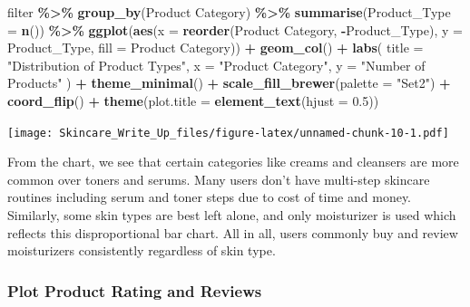 \documentclass[
]{article}
\newenvironment{Shaded}{\begin{snugshade}}{\end{snugshade}}
\newcommand{\AttributeTok}[1]{\textcolor[rgb]{0.13,0.29,0.53}{#1}}
\newcommand{\FloatTok}[1]{\textcolor[rgb]{0.00,0.00,0.81}{#1}}
\newcommand{\FunctionTok}[1]{\textcolor[rgb]{0.13,0.29,0.53}{\textbf{#1}}}
\newcommand{\NormalTok}[1]{#1}
\newcommand{\SpecialCharTok}[1]{\textcolor[rgb]{0.81,0.36,0.00}{\textbf{#1}}}
\newcommand{\StringTok}[1]{\textcolor[rgb]{0.31,0.60,0.02}{#1}}
\begin{document}
\begin{Shaded}
\begin{Highlighting}[]
\NormalTok{filter }\SpecialCharTok{\%\textgreater{}\%}
  \FunctionTok{group\_by}\NormalTok{(}\StringTok{\textasciigrave{}}\AttributeTok{Product Category}\StringTok{\textasciigrave{}}\NormalTok{) }\SpecialCharTok{\%\textgreater{}\%}
  \FunctionTok{summarise}\NormalTok{(}\AttributeTok{Product\_Type =} \FunctionTok{n}\NormalTok{()) }\SpecialCharTok{\%\textgreater{}\%}
  \FunctionTok{ggplot}\NormalTok{(}\FunctionTok{aes}\NormalTok{(}\AttributeTok{x =} \FunctionTok{reorder}\NormalTok{(}\StringTok{\textasciigrave{}}\AttributeTok{Product Category}\StringTok{\textasciigrave{}}\NormalTok{, }\SpecialCharTok{{-}}\NormalTok{Product\_Type), }\AttributeTok{y =}\NormalTok{ Product\_Type, }\AttributeTok{fill =} \StringTok{\textasciigrave{}}\AttributeTok{Product Category}\StringTok{\textasciigrave{}}\NormalTok{)) }\SpecialCharTok{+}
  \FunctionTok{geom\_col}\NormalTok{() }\SpecialCharTok{+}
  \FunctionTok{labs}\NormalTok{(}
    \AttributeTok{title =} \StringTok{"Distribution of Product Types"}\NormalTok{,}
    \AttributeTok{x =} \StringTok{"Product Category"}\NormalTok{,}
    \AttributeTok{y =} \StringTok{"Number of Products"}
\NormalTok{  ) }\SpecialCharTok{+}
  \FunctionTok{theme\_minimal}\NormalTok{() }\SpecialCharTok{+}
  \FunctionTok{scale\_fill\_brewer}\NormalTok{(}\AttributeTok{palette =} \StringTok{"Set2"}\NormalTok{) }\SpecialCharTok{+} 
  \FunctionTok{coord\_flip}\NormalTok{() }\SpecialCharTok{+}  
  \FunctionTok{theme}\NormalTok{(}\AttributeTok{plot.title =} \FunctionTok{element\_text}\NormalTok{(}\AttributeTok{hjust =} \FloatTok{0.5}\NormalTok{))}
\end{Highlighting}
\end{Shaded}

\texttt{[image: Skincare\_Write\_Up\_files/figure-latex/unnamed-chunk-10-1.pdf]}

From the chart, we see that certain categories like creams and cleansers
are more common over toners and serums. Many users don't have multi-step
skincare routines including serum and toner steps due to cost of time
and money. Similarly, some skin types are best left alone, and only
moisturizer is used which reflects this disproportional bar chart. All
in all, users commonly buy and review moisturizers consistently
regardless of skin type.

\subsubsection{Plot Product Rating and
Reviews}\label{plot-product-rating-and-reviews}
\end{document}
